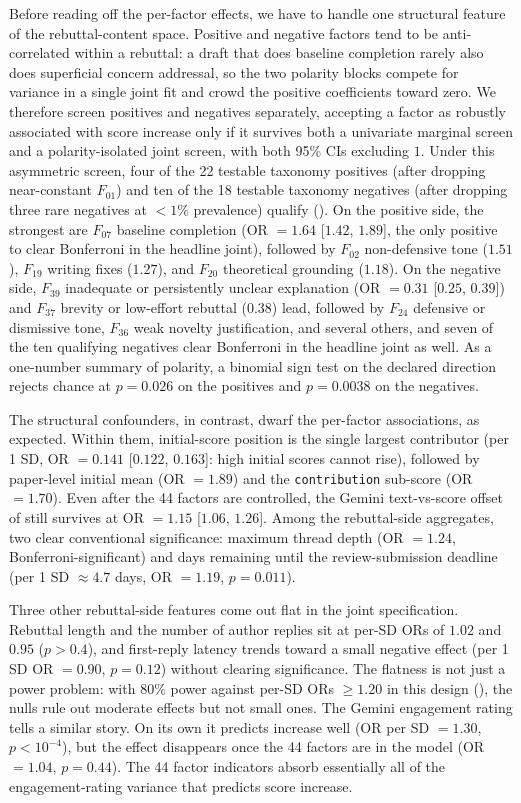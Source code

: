 \documentclass{article}
\newcommand{\code}[1]{\texttt{#1}}
\begin{document}
Before reading off the per-factor effects, we have to handle one structural feature of the rebuttal-content space. Positive and negative factors tend to be anti-correlated within a rebuttal: a draft that does baseline completion rarely also does superficial concern addressal, so the two polarity blocks compete for variance in a single joint fit and crowd the positive coefficients toward zero. We therefore screen positives and negatives separately, accepting a factor as robustly associated with score increase only if it survives both a univariate marginal screen and a polarity-isolated joint screen, with both 95\% CIs excluding $1$. Under this asymmetric screen, four of the 22 testable taxonomy positives (after dropping near-constant $F_{01}$) and ten of the 18 testable taxonomy negatives (after dropping three rare negatives at $<1\%$ prevalence) qualify (). On the positive side, the strongest are $F_{07}$ baseline completion (OR $= 1.64$ [$1.42$, $1.89$], the only positive to clear Bonferroni in the headline joint), followed by $F_{02}$ non-defensive tone ($1.51$), $F_{19}$ writing fixes ($1.27$), and $F_{20}$ theoretical grounding ($1.18$). On the negative side, $F_{39}$ inadequate or persistently unclear explanation (OR $= 0.31$ [$0.25$, $0.39$]) and $F_{37}$ brevity or low-effort rebuttal ($0.38$) lead, followed by $F_{24}$ defensive or dismissive tone, $F_{36}$ weak novelty justification, and several others, and seven of the ten qualifying negatives clear Bonferroni in the headline joint as well. As a one-number summary of polarity, a binomial sign test on the declared direction rejects chance at $p = 0.026$ on the positives and $p = 0.0038$ on the negatives.

The structural confounders, in contrast, dwarf the per-factor associations, as expected. Within them, initial-score position is the single largest contributor (per 1 SD, OR $= 0.141$ [$0.122$, $0.163$]: high initial scores cannot rise), followed by paper-level initial mean (OR $= 1.89$) and the \code{contribution} sub-score (OR $= 1.70$). Even after the 44 factors are controlled, the Gemini text-vs-score offset of  still survives at OR $= 1.15$ [$1.06$, $1.26$]. Among the rebuttal-side aggregates, two clear conventional significance: maximum thread depth (OR $= 1.24$, Bonferroni-significant) and days remaining until the review-submission deadline (per 1 SD $\approx 4.7$ days, OR $= 1.19$, $p = 0.011$).

Three other rebuttal-side features come out flat in the joint specification. Rebuttal length and the number of author replies sit at per-SD ORs of $1.02$ and $0.95$ ($p > 0.4$), and first-reply latency trends toward a small negative effect (per 1 SD OR $= 0.90$, $p = 0.12$) without clearing significance. The flatness is not just a power problem: with $80\%$ power against per-SD ORs $\geq 1.20$ in this design (), the nulls rule out moderate effects but not small ones. The Gemini engagement rating tells a similar story. On its own it predicts increase well (OR per SD $= 1.30$, $p < 10^{-4}$), but the effect disappears once the 44 factors are in the model (OR $= 1.04$, $p = 0.44$). The 44 factor indicators absorb essentially all of the engagement-rating variance that predicts score increase.
\end{document}
